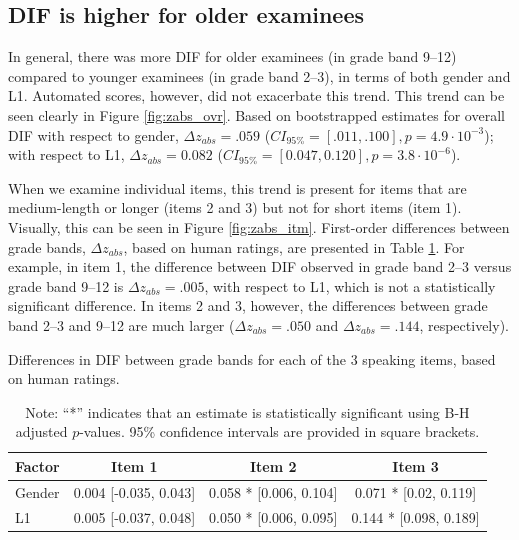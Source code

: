 \documentclass [PhD] {uclathes}
\begin{document}
\subsection{DIF is higher for older examinees}

In general, there was more DIF for older examinees (in grade band 9–12) compared to younger examinees (in grade band 2–3), in terms of both gender and L1. Automated scores, however, did not exacerbate this trend. This trend can be seen clearly in Figure \ref{fig:zabs_ovr}. Based on bootstrapped estimates for overall DIF with respect to gender, $\Delta z_{abs} = .059$ ($CI_{95\%} = [.011, .100], p = 4.9 \cdot 10^{-3}$); with respect to L1, $\Delta z_{abs} = 0.082$ ($CI_{95\%} = [0.047, 0.120], p = 3.8 \cdot 10^{-6}$). 

When we examine individual items, this trend is present for items that are medium-length or longer (items 2 and 3) but not for short items (item 1). Visually, this can be seen in Figure \ref{fig:zabs_itm}. First-order differences between grade bands, $\Delta z_{abs}$, based on human ratings, are presented in Table \ref{gr_diff}. For example, in item 1, the difference between DIF observed in grade band 2–3 versus grade band 9–12 is $\Delta z_{abs} = .005$, with respect to L1, which is not a statistically significant difference. In items 2 and 3, however, the differences between grade band 2–3 and 9–12 are much larger ($\Delta z_{abs} = .050$ and $\Delta z_{abs} = .144$, respectively). 

\begin{table}[htbp]
\centering
\caption{\label{gr_diff}
Differences in DIF between grade bands for each of the 3 speaking items, based on human ratings.}
\small  %
\begin{tabular}{lccc}
\toprule
\textbf{Factor} & \textbf{Item 1} & \textbf{Item 2} & \textbf{Item 3} \\
\midrule
Gender & 0.004 [-0.035, 0.043] & 0.058 * [0.006, 0.104] & 0.071 * [0.02, 0.119] \\
L1 & 0.005 [-0.037, 0.048] & 0.050 * [0.006, 0.095] & 0.144 * [0.098, 0.189] \\
\bottomrule
\end{tabular}
\caption*{\small Note: “*” indicates that an estimate is statistically significant using B-H adjusted $p$-values. 95\% confidence intervals are provided in square brackets.}
\end{table}
\end{document}
